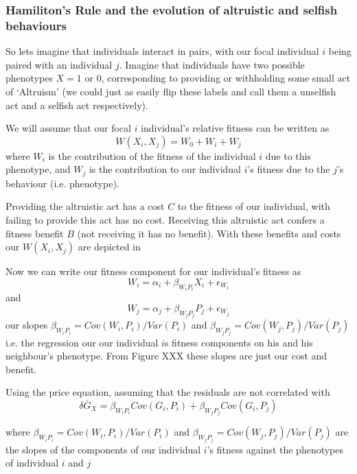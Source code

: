 
\subsubsection{Hamiliton's Rule and the evolution of altruistic and
  selfish behaviours}
So lets imagine that individuals interact in pairs, with our focal
individual $i$ being paired with an individual $j$.  
Imagine that individuals have two possible phenotypes $X=1$ or $0$,
corresponding to providing or withholding some small act of `Altruism'
(we could just as easily flip these labels and call them a unselfish
act and a selfish act respectively). 


We will assume that our focal $i$ individual's relative fitness can be written as 
\begin{equation}
W(X_i,X_j)= W_0 + W_i +W_j
\end{equation}
where $W_i$ is the contribution of the fitness of the individual $i$ due
to this phenotype, and $W_j$ is the contribution to our
individual $i$'s fitness due to the $j$'s behaviour (i.e. phenotype).

Providing the altruistic act has a cost $C$ to the fitness of our
individual, with failing to provide this act has no cost. Receiving this
altruistic act confers a fitness benefit $B$ (not receiving it has no benefit).
With these benefits and costs our $W(X_i,X_j)$ are depicted in 

Now we can write our fitness component for our individual's fitness
as 
\begin{equation}
W_i = \alpha_i + \beta_{W_i P_i} X_i + \epsilon_{W_i}
\end{equation}
and
\begin{equation}
W_j = \alpha_j + \beta_{W_j P_j} P_j + \epsilon_{W_j}
\end{equation}
our slopes $\beta_{W_i P_i} = Cov(W_i,P_i)/Var(P_i)$ and $\beta_{W_j
  P_j} = Cov(W_j,P_j)/Var(P_j)$ i.e. the regression our our individual
$i$s fitness components on his and his neighbour's phenotype. From 
Figure XXX these slopes are just our cost and benefit.


Using the price equation, assuming that the residuals are not
correlated with 
\begin{equation}
\delta \bar{G}_X = \beta_{W_i P_i} Cov(G_i,P_i) +  \beta_{W_j P_j} Cov(G_i,P_j) 
\end{equation}

where $\beta_{W_i P_i} =Cov(W_i,P_i)/Var(P_i)$ and $\beta_{W_j P_j}
=Cov(W_j,P_j)/Var(P_j)$ are the slopes of the components of our individual $i$'s fitness 
against the phenotypes of individual $i$ and $j$